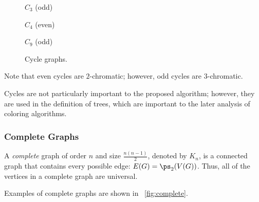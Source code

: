 \begin{figure}[H]
  \begin{minipage}{1.75in}
    \centering

    \(C_3\) (odd)
  \end{minipage}
  \begin{minipage}{1.75in}
    \centering

    \(C_4\) (even)
  \end{minipage}
  \begin{minipage}{1.75in}
    \centering

    \(C_9\) (odd)
  \end{minipage}
  \caption{Cycle graphs.}
  \label{fig:cycle}
\end{figure}

Note that even cycles are \(2\)-chromatic; however, odd cycles are \(3\)-chromatic.

Cycles are not particularly important to the proposed algorithm; however, they are used in the definition of trees,
which are important to the later analysis of coloring algorithms.

\subsubsection{Complete Graphs}\label{sec:sub:sub:complete}

A \emph{complete} graph of order \(n\) and size \(\frac{n(n-1)}{2}\), denoted by \(K_n\), is a connected graph that
contains every possible edge: \(E(G)=\ps_2(V(G))\).  Thus, all of the vertices in a complete graph are universal.

Examples of complete graphs are shown in \figurename~\ref{fig:complete}.

